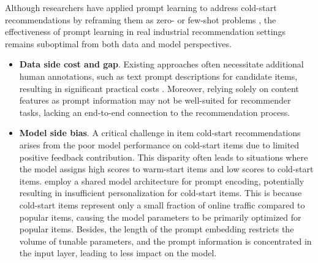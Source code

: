 \documentclass[sigconf]{acmart}
\begin{document}
Although researchers have applied prompt learning to address cold-start recommendations by reframing them as zero- or few-shot problems \cite{wu2024personalized,yi2023contrastive}, the effectiveness of prompt learning in real industrial recommendation settings remains suboptimal from both data and model perspectives.

\begin{itemize}[leftmargin=*]
    \item \textbf{Data side cost and gap}. Existing approaches often necessitate additional human annotations, such as text prompt descriptions for candidate items, resulting in significant practical costs \cite{zhai2023knowledge}.
    Moreover, relying solely on content features as prompt information may not be well-suited for recommender tasks, lacking an end-to-end connection to the recommendation process.
    \item \textbf{Model side bias}.
     A critical challenge in item cold-start recommendations arises from the poor model performance on cold-start items due to limited positive feedback contribution. 
     This disparity often leads to situations where the model assigns high scores to warm-start items and low scores to cold-start items.
    \cite{zhai2023knowledge,geng2022recommendation} employ a shared model architecture for prompt encoding, potentially resulting in insufficient personalization for cold-start items. 
    This is because cold-start items represent only a small fraction of online traffic compared to popular items, causing the model parameters to be primarily optimized for popular items. 
    Besides, the length of the prompt embedding restricts the volume of tunable parameters, and the prompt information is concentrated in the input layer, leading to less impact on the model.
\end{itemize}
\end{document}
